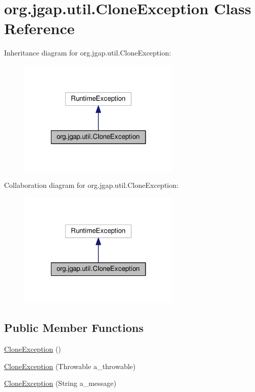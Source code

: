 \hypertarget{classorg_1_1jgap_1_1util_1_1_clone_exception}{\section{org.\-jgap.\-util.\-Clone\-Exception Class Reference}
\label{classorg_1_1jgap_1_1util_1_1_clone_exception}
}


Inheritance diagram for org.\-jgap.\-util.\-Clone\-Exception\-:
\nopagebreak
\begin{figure}[H]
\begin{center}
\leavevmode
\includegraphics[width=218pt]{classorg_1_1jgap_1_1util_1_1_clone_exception__inherit__graph}
\end{center}
\end{figure}


Collaboration diagram for org.\-jgap.\-util.\-Clone\-Exception\-:
\nopagebreak
\begin{figure}[H]
\begin{center}
\leavevmode
\includegraphics[width=218pt]{classorg_1_1jgap_1_1util_1_1_clone_exception__coll__graph}
\end{center}
\end{figure}
\subsection*{Public Member Functions}
\begin{DoxyCompactItemize}
\item 
\hyperlink{classorg_1_1jgap_1_1util_1_1_clone_exception_adb04c3a6d8d16b6e5bb46332fd727c23}{Clone\-Exception} ()
\item 
\hyperlink{classorg_1_1jgap_1_1util_1_1_clone_exception_ab49d184dfe49e55423d32235e4d0aa75}{Clone\-Exception} (Throwable a\-\_\-throwable)
\item 
\hyperlink{classorg_1_1jgap_1_1util_1_1_clone_exception_af5dc2a5aae0eec6ce0a124fdfd994d14}{Clone\-Exception} (String a\-\_\-message)
\end{DoxyCompactItemize}


